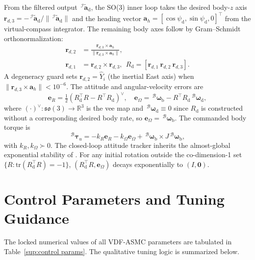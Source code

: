 \documentclass{IEEEtaes}
\begin{document}
From the filtered output $\,^\mathcal{I}\tilde{\boldsymbol{a}}_\text{d}$, the SO(3) inner loop takes the desired body-$z$ axis $\boldsymbol{r}_{d,3}=-\,^\mathcal{I}\tilde{\boldsymbol{a}}_\text{d}/\|\,^\mathcal{I}\tilde{\boldsymbol{a}}_\text{d}\|$ and the heading vector $\boldsymbol{a}_h=[\cos\psi_\text{d},\sin\psi_\text{d},0]^\top$ from the virtual-compass integrator. The remaining body axes follow by Gram--Schmidt orthonormalization:
\begin{align} \label{R_d construction: equation}
    \boldsymbol{r}_{d,2} &= \frac{\boldsymbol{r}_{d,3}\times\boldsymbol{a}_h}{\|\boldsymbol{r}_{d,3}\times\boldsymbol{a}_h\|}, \nonumber\\
    \boldsymbol{r}_{d,1} &= \boldsymbol{r}_{d,2}\times\boldsymbol{r}_{d,3},\ \ R_\text{d}=[\boldsymbol{r}_{d,1}\ \boldsymbol{r}_{d,2}\ \boldsymbol{r}_{d,3}].
\end{align}
A degeneracy guard sets $\boldsymbol{r}_{d,2}=\hat{Y}_i$ (the inertial East axis) when $\|\boldsymbol{r}_{d,3}\times\boldsymbol{a}_h\|<10^{-6}$. The attitude and angular-velocity errors are
\begin{equation} \label{so3 errors: equation}
    \boldsymbol{e}_R = \tfrac12(R_\text{d}^\top R - R^\top R_\text{d})^\vee,\quad \boldsymbol{e}_\Omega = \,^\mathcal{B} \boldsymbol{\omega}_{\text{b}} - R^\top R_\text{d}\,^\mathcal{B}\boldsymbol{\omega}_\text{d},
\end{equation}
where $(\cdot)^\vee:\mathfrak{so}(3)\to\mathbb{R}^3$ is the vee map and $\,^\mathcal{B}\boldsymbol{\omega}_\text{d}\equiv 0$ since $R_\text{d}$ is constructed without a corresponding desired body rate, so $\boldsymbol{e}_\Omega=\,^\mathcal{B} \boldsymbol{\omega}_{\text{b}}$. The commanded body torque is
\begin{equation} \label{so3 torque: equation}
    \,^\mathcal{B}\boldsymbol{\tau}_u = -k_R\boldsymbol{e}_R - k_\Omega\boldsymbol{e}_\Omega + \,^\mathcal{B} \boldsymbol{\omega}_{\text{b}}\times J\,^\mathcal{B} \boldsymbol{\omega}_{\text{b}},
\end{equation}
with $k_R,k_\Omega\succ 0$. The closed-loop attitude tracker inherits the almost-global exponential stability of \cite[Thm.~3.1]{lee2010}. For any initial rotation outside the co-dimension-1 set $\{R:\text{tr}(R_\text{d}^\top R)=-1\}$, $(R_\text{d}^\top R,\boldsymbol{e}_\Omega)$ decays exponentially to $(I,\boldsymbol{0})$.

\section{Control Parameters and Tuning Guidance} \label{tuning: section}
The locked numerical values of all VDF-ASMC parameters are tabulated in Table~\ref{sup:control params}. The qualitative tuning logic is summarized below.
\end{document}
